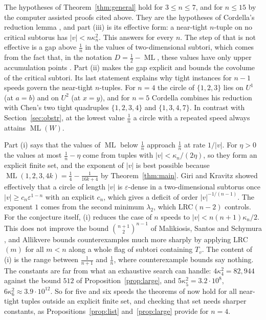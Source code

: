 \documentclass[12pt]{amsart}
\theoremstyle{definition}\newtheorem{definition}[theorem]{Definition}
\theoremstyle{remark}\newtheorem{remark}[theorem]{Remark}
\newcommand{\ML}{\operatorname{ML}}
\newcommand{\eucl}[1]{\lvert #1\rvert}
\newcommand{\Uone}{U^{1}}\newcommand{\Utwo}{U^{2}}
\begin{document}
The hypotheses of Theorem~\ref{thm:general} hold for $3\le n\le7$, and for $n\le15$ by the computer assisted proofs cited above. They are the hypotheses of Cordella's reduction lemma \cite[Lemma~2.4]{Cordella}, and part (iii) is its effective form: a near-tight $n$-tuple on no critical subtorus has $\eucl v<n\kappa_n^2$. This answers \cite[Question~6.7]{Cordella} for every $n$. The step of \cite{Cordella} that is not effective is a gap above $\frac1n$ in the values of two-dimensional subtori, which comes from the fact that, in the notation $D=\frac12-\ML$, these values have only upper accumulation points \cite[Theorem~1.4]{GiriKravitz}. Part (ii) makes the gap explicit and bounds the covolume of the critical subtori. Its last statement explains why tight instances for $n-1$ speeds govern the near-tight $n$-tuples. For $n=4$ the circle of $\{1,2,3\}$ lies on $\Uone$ (at $a=b$) and on $\Utwo$ (at $x=y$), and for $n=5$ Cordella combines his reduction with Chen's two tight quadruples $\{1,2,3,4\}$ and $\{1,3,4,7\}$. In contrast with Section~\ref{sec:obstr}, at the lowest value $\frac1n$ a circle with a repeated speed always attains $\ML(W)$.

Part (i) says that the values of $\ML$ below $\frac1n$ approach $\frac1n$ at rate $1/\eucl v$. For $\eta>0$ the values at most $\frac1n-\eta$ come from tuples with $\eucl v<\kappa_n/(2\eta)$, so they form an explicit finite set, and the exponent of $\eucl v$ is best possible because $\ML(1,2,3,4k)=\frac14-\frac1{16k+4}$ by Theorem~\ref{thm:main}. Giri and Kravitz \cite[Section~7]{GiriKravitz} showed effectively that a circle of length $\eucl v$ is $\varepsilon$-dense in a two-dimensional subtorus once $\eucl v\ge c_n\varepsilon^{1-n}$ with an explicit $c_n$, which gives a deficit of order $\eucl v^{-1/(n-1)}$. The exponent $1$ comes from the second minimum $\lambda_2$, which LRC$(n-2)$ controls. For the conjecture itself, (i) reduces the case of $n$ speeds to $\eucl v<n(n+1)\kappa_n/2$. This does not improve the bound $\binom{n+1}2^{n-1}$ of Malikiosis, Santos and Schymura \cite{MSS}, and Allikvere \cite[Theorem~3.8]{Allikvere} bounds counterexamples much more sharply by applying LRC$(m)$ for all $m<n$ along a whole flag of subtori containing $T_v$. The content of (i) is the range between $\frac1{n+1}$ and $\frac1n$, where counterexample bounds say nothing. The constants are far from what an exhaustive search can handle: $4\kappa_4^2=82{,}944$ against the bound $512$ of Proposition~\ref{prop:large}, and $5\kappa_5^2=3.2\cdot10^8$, $6\kappa_6^2\approx3.9\cdot10^{12}$. So for five and six speeds the theorems of \cite{Cordella} now hold for all near-tight tuples outside an explicit finite set, and checking that set needs sharper constants, as Propositions~\ref{prop:list} and~\ref{prop:large} provide for $n=4$.
\end{document}
